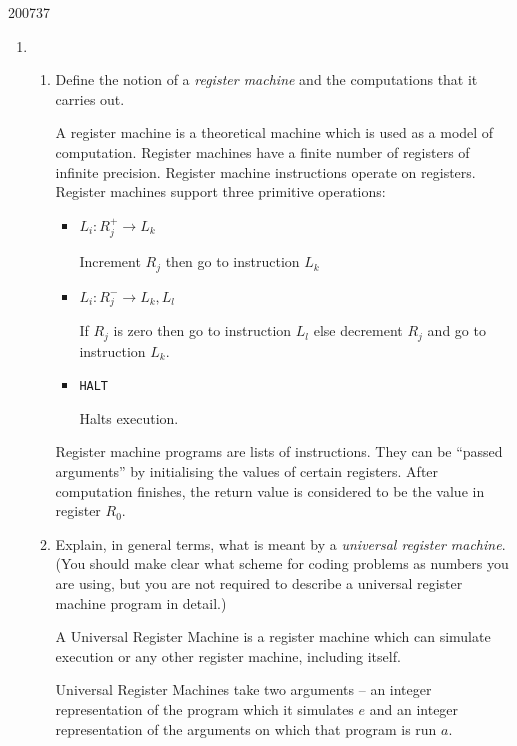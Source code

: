 \documentclass[10pt,\jkfside,a4paper]{article}
\begin{document}
\begin{examquestion}{2007}{3}{7}

\begin{enumerate}

\item

\begin{enumerate}

\item Define the notion of a \textit{register machine} and the computations
that it carries out.

A register machine is a theoretical machine which is used as a model of
computation. Register machines have a finite number of registers of infinite
precision. Register machine instructions operate on registers. Register
machines support three primitive operations:
\begin{itemize}

\item $L_i: R_j^+ \to L_k$

Increment $R_j$ then go to instruction $L_k$

\item $L_i: R_j^- \to L_k, L_l$

If $R_j$ is zero then go to instruction $L_l$ else decrement $R_j$ and go to
instruction $L_k$.

\item \texttt{HALT}

Halts execution.

\end{itemize}

Register machine programs are lists of instructions. They can be ``passed
arguments'' by initialising the values of certain registers. After
computation finishes, the return value is considered to be the value in
register $R_0$.

\item Explain, in general terms, what is meant by a \textit{universal
register machine}. (You should make clear what scheme for coding problems as
numbers you are using, but you are not required to describe a universal
register machine program in detail.)

A Universal Register Machine is a register machine which can simulate
execution or any other register machine, including itself.

Universal Register Machines take two arguments -- an integer representation
of the program which it simulates $e$ and an integer representation of the
arguments on which that program is run $a$.


\end{enumerate}
\end{enumerate}
\end{examquestion}
\end{document}
